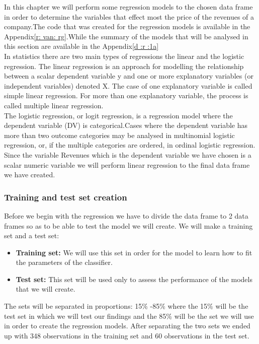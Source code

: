 \documentclass{book}
\begin{document}
In this chapter we will perform some regression models to the chosen data frame in order to determine the variables that effect most the price of the revenues of a company.The code that was created for the regression models is available in the Appendix\ref{r: van: rg}.While the summary of the models that will be analysed in this section are available in the Appendix\ref{d :r :1a}\\
In statistics there are two main types of regressions the linear and the logistic regression. The linear regression is an approach for modelling the relationship between a scalar dependent variable y and one or more explanatory variables (or independent variables) denoted X. The case of one explanatory variable is called simple linear regression. For more than one explanatory variable, the process is called multiple linear regression.\\
The logistic regression, or logit regression, is a regression model where the dependent variable (DV) is categorical.Cases where the dependent variable has more than two outcome categories may be analysed in multinomial logistic regression, or, if the multiple categories are ordered, in ordinal logistic regression.\\
Since the variable Revenues which is the dependent variable we have chosen is a scalar numeric variable we will perform linear regression to the final data frame we have created.
\subsubsection{Training and test set creation}
Before we begin with the regression we have to divide the data frame to 2 data frames so as to be able to test the model we will create. We will make a training set and a test set:
\begin{itemize}
\item \textbf{Training set:} We will use this set in order for the model to learn how to fit the parameters of the classifier.
\item \textbf{Test set:} This set will be used only to assess the performance of the models that we will create.
\end{itemize}  
The sets will be separated in proportions: 15\% -85\% where the 15\% will be the test set in which we will test our findings and the 85\% will be the set we will use in order to create the regression models. After separating the two sets we ended up with 348 observations in the training set and 60 observations in the test set.
\end{document}
